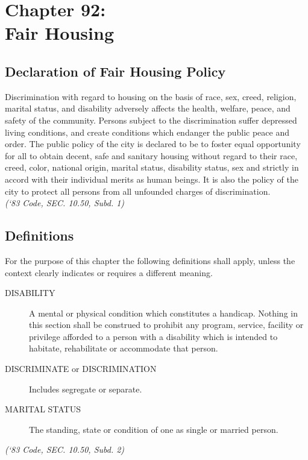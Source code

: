 \chapter*{Chapter 92: \\
	Fair Housing}
    \minitoc
    \pagebreak

\section{Declaration of Fair Housing Policy}
Discrimination with regard to housing on the basis of race, sex, creed, religion, marital status, and disability adversely affects the health, welfare, peace, and safety of the community.  Persons subject to the discrimination suffer depressed living conditions, and create conditions which endanger the public peace and order. The public policy of the city is declared to be to foster equal opportunity for all to obtain decent, safe and sanitary housing without regard to their race, creed, color, national origin, marital status, disability status, sex and strictly in accord with their individual merits as human beings. It is also the policy of the city to protect all persons from all unfounded charges of discrimination.\\
\emph{(‘83 Code, SEC. 10.50, Subd. 1)}
\section{Definitions}
For the purpose of this chapter the following definitions shall apply, unless the context clearly indicates or requires a different meaning.
\begin{description}
    \item[DISABILITY] A mental or physical condition which constitutes a handicap.  Nothing in this section shall be construed to prohibit any program, service, facility or privilege afforded to a person with a disability which is intended to habitate, rehabilitate or accommodate that person.
    \item[DISCRIMINATE or DISCRIMINATION] Includes segregate or separate.
    \item[MARITAL STATUS] The standing, state or condition of one as single or married person.
\end{description}
\emph{(‘83 Code, SEC. 10.50, Subd. 2)}

